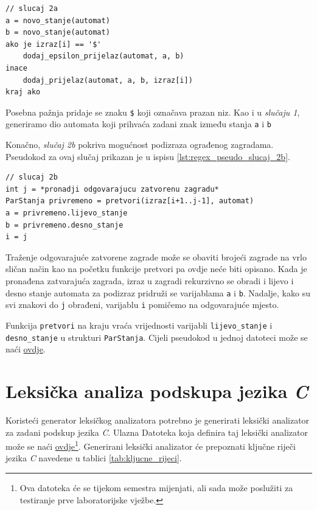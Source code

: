 \documentclass[times, 12pt, utf8]{book}
\begin{document}
\begin{lstlisting}[caption={Slučaj 2a u funkciji \texttt{pretvori}.},label=lst:regex_pseudo_slucaj_2a]
// slucaj 2a
a = novo_stanje(automat)
b = novo_stanje(automat)
ako je izraz[i] == '$'
    dodaj_epsilon_prijelaz(automat, a, b)
inace
    dodaj_prijelaz(automat, a, b, izraz[i])
kraj ako
\end{lstlisting}

Posebna pažnja pridaje se znaku \verb|$| koji označava prazan niz.
Kao i u \emph{slučaju 1}, generiramo dio automata koji prihvaća zadani znak između stanja \verb|a| i \verb|b|

Konačno, \emph{slučaj 2b} pokriva mogućnost podizraza ograđenog zagradama.
Pseudokod za ovaj slučaj prikazan je u ispisu \ref{lst:regex_pseudo_slucaj_2b}.

\begin{lstlisting}[caption={Slučaj 2b u funkciji \texttt{pretvori}.},label=lst:regex_pseudo_slucaj_2b]
// slucaj 2b
int j = *pronadji odgovarajucu zatvorenu zagradu*
ParStanja privremeno = pretvori(izraz[i+1..j-1], automat)
a = privremeno.lijevo_stanje
b = privremeno.desno_stanje
i = j
\end{lstlisting}

Traženje odgovarajuće zatvorene zagrade može se obaviti brojeći zagrade na vrlo sličan način kao na početku funkcije pretvori pa ovdje neće biti opisano.
Kada je pronađena zatvarajuća zagrada, izraz u zagradi rekurzivno se obradi i lijevo i desno stanje automata za podizraz pridruži se varijablama \verb|a| i \verb|b|.
Nadalje, kako su svi znakovi do \verb|j| obrađeni, varijablu \verb|i| pomičemo na odgovarajuće mjesto.

Funkcija \verb|pretvori| na kraju vraća vrijednosti varijabli \verb|lijevo_stanje| i \verb|desno_stanje| u strukturi \verb|ParStanja|.
Cijeli pseudokod u jednoj datoteci može se naći \href{https://github.com/fer-ppj/ppj-labosi/raw/master/res/lab1/regex_pseudokod.txt}{ovdje}.

\section{Leksička analiza podskupa jezika \emph{C}}
Koristeći generator leksičkog analizatora potrebno je generirati leksički analizator za zadani podskup jezika \emph{C}.
Ulazna Datoteka koja definira taj leksički analizator može se naći \href{https://github.com/fer-ppj/ppj-labosi/raw/master/res/lab1/simplePpjLang.lan}{ovdje}\footnote{Ova datoteka će se tijekom semestra mijenjati, ali sada može poslužiti za testiranje prve laboratorijske vježbe.}.
Generirani leksički analizator će prepoznati ključne riječi jezika \emph{C} navedene u tablici \ref{tab:kljucne_rijeci}.
\end{document}
